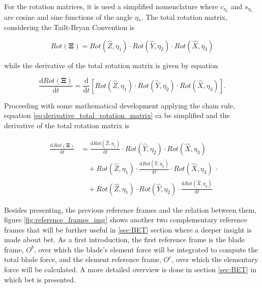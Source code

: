 For the rotation matrices, it is used a simplified nomenclature where $c_{\eta_{*}}$ and $s_{\eta_{*}}$ are cosine and sine functions of the angle $\eta_{*}$. The total rotation matrix, considering the Tailt-Bryan Convention is

\begin{equation}
    Rot(\boldsymbol{\Xi})= Rot(\hat{Z},\eta_1) \cdot Rot(\hat{Y},\eta_2) \cdot Rot(\hat{X},\eta_3)
    \label{eq:total_rotation_matrix}
\end{equation}

while the derivative of the total rotation matrix is given by equation

\begin{equation}
    \frac{\mathrm{d}Rot(\boldsymbol{\Xi})}{\mathrm{d}t}= \frac{\mathrm{d}}{\mathrm{d}t} \left[Rot(\hat{Z},\eta_1) \cdot Rot(\hat{Y},\eta_2) \cdot Rot(\hat{X},\eta_3)\right].
    \label{eq:derivative_total_rotation_matrix}
\end{equation}

Proceeding with some mathematical development applying the chain rule, equation \ref{eq:derivative_total_rotation_matrix}  ca be simplified and the derivative of the total rotation matrix is


\begin{equation}
    \begin{aligned}
        \frac{\mathrm{d} \, Rot(\boldsymbol{\Xi})}{\mathrm{d}t} &= 
        \frac{\mathrm{d} Rot(\hat{Z}, \eta_1)}{\mathrm{d}t} \cdot Rot(\hat{Y}, \eta_2) \cdot Rot(\hat{X}, \eta_3) \\
        &\quad + Rot(\hat{Z}, \eta_1) \cdot \frac{\mathrm{d} Rot(\hat{Y}, \eta_2)}{\mathrm{d}t} \cdot Rot(\hat{X}, \eta_3) \\
        &\quad + Rot(\hat{Z}, \eta_1) \cdot Rot(\hat{Y}, \eta_2) \cdot \frac{\mathrm{d} Rot(\hat{X}, \eta_3)}{\mathrm{d}t}
    \end{aligned}.
    \label{eq:exp_derivative_total_rotation_matrix}
\end{equation}


Besides presenting, the previous reference frames and the relation between them, figure \ref{fig:reference_frames_img} shows another two complementary reference frames that will be further useful in \ref{sec:BET} section where a deeper insight is made about \gls{bet}. As a first introduction, the first reference frame is the blade frame, $O^b$, over which the blade's element force will be integrated to compute the total blade force, and the element reference frame, $O^e$, over which the elementary force will be calculated. A more detailed overview is done in section \ref{sec:BET} in which \gls{bet} is presented.


